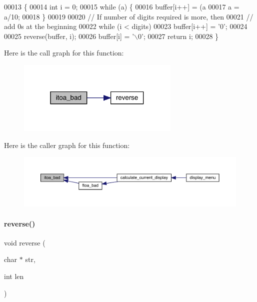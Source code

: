 \begin{DoxyCode}
00013                                               \{
00014   \textcolor{keywordtype}{int} i = 0;
00015    \textcolor{keywordflow}{while} (a) \{
00016        buffer[i++] = (a%
00017        a = a/10;
00018    \}
00019 
00020    \textcolor{comment}{// If number of digits required is more, then}
00021    \textcolor{comment}{// add 0s at the beginning}
00022    \textcolor{keywordflow}{while} (i < digits)
00023        buffer[i++] = \textcolor{charliteral}{'0'};
00024 
00025    reverse(buffer, i);
00026    buffer[i] = \textcolor{charliteral}{'\(\backslash\)0'};
00027    \textcolor{keywordflow}{return} i;
00028 \}
\end{DoxyCode}
Here is the call graph for this function\+:\nopagebreak
\begin{figure}[H]
\begin{center}
\leavevmode
\includegraphics[width=220pt]{vlib_8c_a08fa7134f8b9a80eeba25f9feab22892_cgraph}
\end{center}
\end{figure}
Here is the caller graph for this function\+:\nopagebreak
\begin{figure}[H]
\begin{center}
\leavevmode
\includegraphics[width=350pt]{vlib_8c_a08fa7134f8b9a80eeba25f9feab22892_icgraph}
\end{center}
\end{figure}
\mbox{\label{vlib_8c_aad7fea725cb4b198ace1aa3df5051244}} 
\paragraph{reverse()}
{\footnotesize\ttfamily void reverse (\begin{DoxyParamCaption}\item[{char $\ast$}]{str,  }\item[{int}]{len }\end{DoxyParamCaption})}



